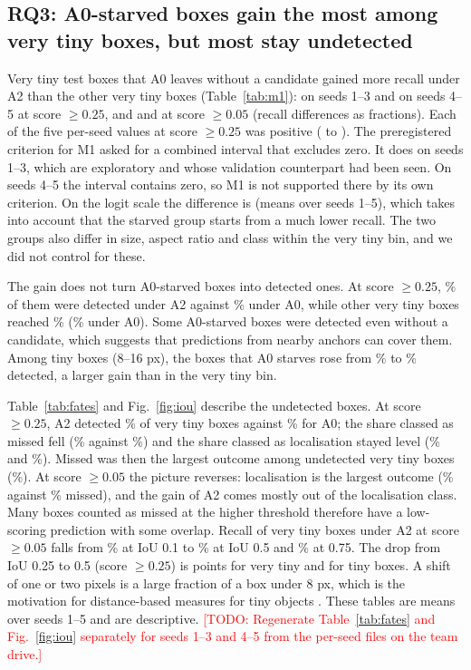 \documentclass[11pt]{article}
\newcommand{\todo}[1]{\textcolor{red}{[TODO: #1]}}
\begin{document}
\subsection{RQ3: A0-starved boxes gain the most among very tiny boxes, but most stay undetected}\label{sec:rq3}
Very tiny test boxes that A0 leaves without a candidate gained more recall under A2 than the other very tiny boxes
(Table~\ref{tab:m1}): \mOneOld{} on seeds 1--3 and \mOneNew{} on seeds 4--5 at score $\geq 0.25$, and \mOneOldLow{} and
\mOneNewLow{} at score $\geq 0.05$ (recall differences as fractions). Each of the five per-seed values at score $\geq 0.25$ was
positive (\mOneSeedMin{} to \mOneSeedMax). The preregistered criterion for M1 asked for a combined interval that excludes zero.
It does on seeds 1--3, which are exploratory and whose validation counterpart had been seen. On seeds 4--5 the interval
contains zero, so M1 is not supported there by its own criterion. On the logit scale the difference is \didLogit{} (means over
seeds 1--5), which takes into account that the starved group starts from a much lower recall. The two groups also differ in
size, aspect ratio and class within the very tiny bin, and we did not control for these.

The gain does not turn A0-starved boxes into detected ones. At score $\geq 0.25$, \starvedAtwo\% of them were detected under A2
against \starvedAzero\% under A0, while other very tiny boxes reached \fedAtwo\% (\fedAzero\% under A0). Some A0-starved boxes
were detected even without a candidate, which suggests that predictions from nearby anchors can cover them. Among tiny boxes
(8--16 px), the \tStarvedN{} boxes that A0 starves rose from \tStarvedAzero\% to \tStarvedAtwo\% detected, a larger gain than in the
very tiny bin.

Table~\ref{tab:fates} and Fig.~\ref{fig:iou} describe the undetected boxes. At score $\geq 0.25$, A2 detected \vtDetAtwo\% of very
tiny boxes against \vtDetAzero\% for A0; the share classed as missed fell (\vtMissAtwo\% against \vtMissAzero\%) and the share
classed as localisation stayed level (\vtLocAtwo\% and \vtLocAzero\%). Missed was then the largest outcome among undetected very
tiny boxes (\vtMissShareUndet\%). At score $\geq 0.05$ the picture reverses: localisation is the largest outcome
(\vtLocShareUndetLow\% against \vtMissShareUndetLow\% missed), and the gain of A2 comes mostly out of the localisation class.
Many boxes counted as missed at the higher threshold therefore have a low-scoring prediction with some overlap. Recall of very
tiny boxes under A2 at score $\geq 0.05$ falls from \recVtOne\% at IoU 0.1 to \recVtHalf\% at IoU 0.5 and \recVtThreeQ\% at 0.75.
The drop from IoU 0.25 to 0.5 (score $\geq 0.25$) is \dropVt{} points for very tiny and \dropT{} for tiny boxes. A shift of one or
two pixels is a large fraction of a box under 8 px, which is the motivation for distance-based measures for tiny objects
\cite{aitodv2}. These tables are means over seeds 1--5 and are descriptive. \todo{Regenerate Table~\ref{tab:fates} and
Fig.~\ref{fig:iou} separately for seeds 1--3 and 4--5 from the per-seed files on the team drive.}
\end{document}
